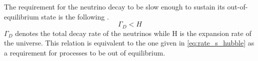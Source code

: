 The requirement for the neutrino decay to be slow enough to sustain its out-of-equilibrium state is the following \cite[p. 30]{Taanila:2008}.
\begin{equation}
	\Gamma_D<H
	\label{eq:out_of_eq}
\end{equation}
$\Gamma_D$ denotes the total decay rate of the neutrinos while H is the expansion rate of the universe. This relation is equivalent to the one given in \ref{eq:rate_s_hubble} as a requirement for processes to be out of equilibrium. 